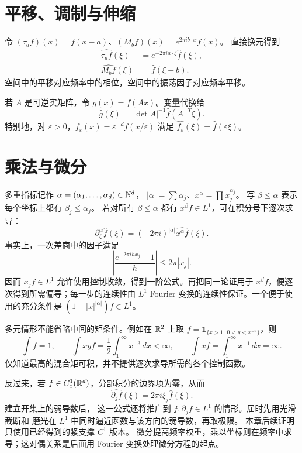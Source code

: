 \section{平移、调制与伸缩}

令 \((\tau_af)(x)=f(x-a)\)、\((M_bf)(x)=e^{2\pi ib\cdot x}f(x)\)。
直接换元得到
\begin{align}
 \widehat{\tau_af}(\xi)&=e^{-2\pi ia\cdot\xi}\widehat f(\xi),\label{eq:fourier-translation}\\
 \widehat{M_bf}(\xi)&=\widehat f(\xi-b).\label{eq:fourier-modulation}
\end{align}
空间中的平移对应频率中的相位，空间中的振荡因子对应频率平移。

若 \(A\) 是可逆实矩阵，令 \(g(x)=f(Ax)\)。变量代换给
\begin{equation}\label{eq:fourier-linear-change}
 \widehat g(\xi)=|\det A|^{-1}\widehat f(A^{-T}\xi).
\end{equation}
特别地，对 \(\varepsilon>0\)，\(f_\varepsilon(x)=\varepsilon^{-d}f(x/\varepsilon)\) 满足
\(\widehat{f_\varepsilon}(\xi)=\widehat f(\varepsilon\xi)\)。

\section{乘法与微分}

多重指标记作 \(\alpha=(\alpha_1,\ldots,\alpha_d)\in\mathbb{N}^d\)，
\(|\alpha|=\sum\alpha_j\)、\(x^\alpha=\prod x_j^{\alpha_j}\)。
写 \(\beta\le\alpha\) 表示每个坐标上都有 \(\beta_j\le\alpha_j\)。
若对所有 \(\beta\le\alpha\) 都有 \(x^\beta f\in L^1\)，可在积分号下逐次求导：
\begin{equation}\label{eq:fourier-moment-derivative}
 \partial_\xi^\alpha\widehat f(\xi)
 =(-2\pi i)^{|\alpha|}\widehat{x^\alpha f}(\xi).
\end{equation}
事实上，一次差商中的因子满足
\[
 \left|\frac{e^{-2\pi ihx_j}-1}{h}\right|\le2\pi|x_j|.
\]
因而 \(x_jf\in L^1\) 允许使用控制收敛，得到一阶公式。再把同一论证用于
\(x^\beta f\)，便逐次得到所需偏导；每一步的连续性由
\(L^1\) Fourier 变换的连续性保证。一个便于使用的充分条件是
\((1+|x|^{|\alpha|})f\in L^1\)。

多元情形不能省略中间的矩条件。例如在 \(\mathbb{R}^2\) 上取
\(f=\mathbf1_{\{x>1,\ 0<y<x^{-2}\}}\)，则
\[
 \int f=1,\qquad \int xyf=\frac12\int_1^\infty x^{-3}\,dx<\infty,
 \qquad \int xf=\int_1^\infty x^{-1}\,dx=\infty.
\]
仅知道最高的混合矩可积，并不提供逐次求导所需的各个控制函数。

反过来，若 \(f\in C_c^1(\mathbb{R}^d)\)，分部积分的边界项为零，从而
\begin{equation}\label{eq:fourier-derivative-multiplier}
 \widehat{\partial_jf}(\xi)=2\pi i\xi_j\widehat f(\xi).
\end{equation}
建立开集上的弱导数后，
这一公式还将推广到 \(f,\partial_jf\in L^1\) 的情形。届时先用光滑截断和
磨光在 \(L^1\) 中同时逼近函数与该方向的弱导数，再取极限。
本章后续证明只使用已经得到的紧支撑 \(C^1\) 版本。
微分提高频率权重，乘以坐标则在频率中求导；这对偶关系是后面用 Fourier
变换处理微分方程的起点。

